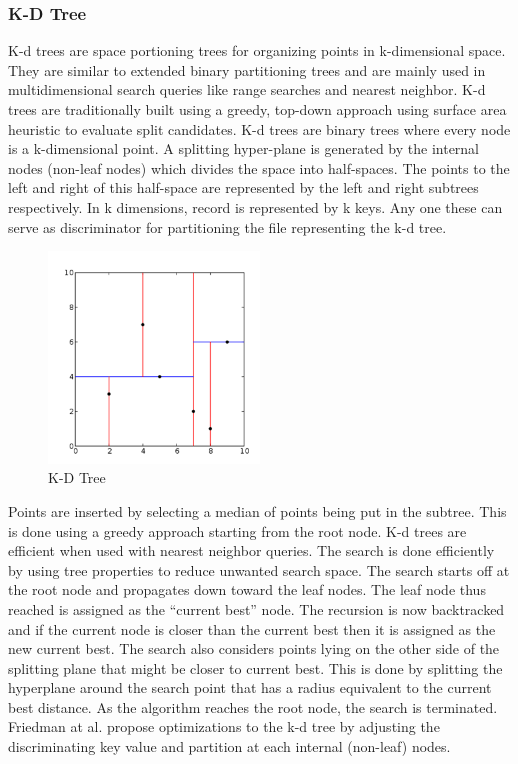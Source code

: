 \documentclass{sig-alternate-05-2015}
\begin{document}
\subsubsection{K-D Tree}

K-d trees are space portioning trees for organizing points in k-dimensional space. They are similar to extended binary partitioning trees and are mainly used in multidimensional search queries like range searches and nearest neighbor. K-d trees are traditionally built using a greedy, top-down approach using surface area heuristic to evaluate split candidates. K-d trees are binary trees where every node is a k-dimensional point. A splitting hyper-plane is generated by the internal nodes (non-leaf nodes) which divides the space into half-spaces. The points to the left and right of this half-space are represented by the left and right subtrees respectively. In k dimensions, record is represented by k keys. Any one these can serve as discriminator for partitioning the file representing the k-d tree. 

\begin{figure}[h!]
\centering
\includegraphics[width=0.5\textwidth]{KDTree.png}
\caption{K-D Tree}
\end{figure}


Points are inserted by selecting a median of points being put in the subtree. This is done using a greedy approach starting from the root node. K-d trees are efficient when used with nearest neighbor queries. The search is done efficiently by using tree properties to reduce unwanted search space. The search starts off at the root node and propagates down toward the leaf nodes. The leaf node thus reached is assigned as the “current best” node. The recursion is now backtracked and if the current node is closer than the current best then it is assigned as the new current best. The search also considers points lying on the other side of the splitting plane that might be closer to current best. This is done by splitting the hyperplane around the search point that has a radius equivalent to the current best distance. As the algorithm reaches the root node, the search is terminated. Friedman at al.\cite{friedman1977algorithm} propose optimizations to the k-d tree by adjusting the discriminating key value and partition at each internal (non-leaf) nodes.
 
\end{document}
